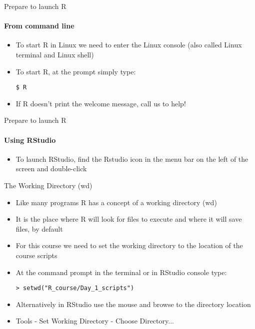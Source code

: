 \documentclass{beamer}
\begin{document}
\begin{frame}[fragile]{Prepare to launch R}
    \framesubtitle{From command line}
    \begin{itemize}
        \item To start R in Linux we need to enter the Linux console (also called Linux terminal and Linux shell)
        \item To start R, at the prompt simply type:
        \begin{verbatim}
$ R\end{verbatim}
        \item If R doesn't print the welcome message, call us to help!
    \end{itemize}
\end{frame}

\begin{frame}{Prepare to launch R}
    \framesubtitle{Using RStudio}
    \begin{itemize}
        \item To launch RStudio, find the Rstudio icon in the menu bar on the left of the screen and double-click
    \end{itemize}
\end{frame}

\begin{frame}[fragile]{The Working Directory (wd)}
    \begin{itemize}
        \item Like many programs R has a concept of a working directory (wd)
        \item It is the place where R will look for files to execute and where it will save files, by default
        \item For this course we need to set the working directory to the location of the course scripts
        \item At the command prompt in the terminal or in RStudio console type:
        \begin{verbatim}
> setwd("R_course/Day_1_scripts")\end{verbatim}
        \item Alternatively in RStudio use the mouse and browse to the directory location
        \item Tools - Set Working Directory - Choose Directory...
    \end{itemize}
\end{frame}
\end{document}
